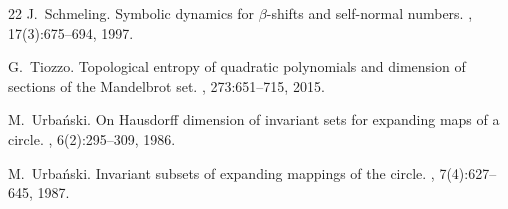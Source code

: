 \documentclass[11pt]{amsart}
\theoremstyle{definition}
\theoremstyle{remark}
\numberwithin{equation}{section}
\begin{document}
\begin{thebibliography}{22}
J.~Schmeling.
\newblock Symbolic dynamics for $\beta$-shifts and self-normal numbers.
, 17(3):675--694, 1997.

G.~Tiozzo.
\newblock Topological entropy of quadratic polynomials and dimension of sections of the Mandelbrot set.
, 273:651--715, 2015.

M.~Urba{\'n}ski.
\newblock On {H}ausdorff dimension of invariant sets for expanding maps of a circle.
, 6(2):295--309, 1986.

M.~Urba\'{n}ski.
\newblock Invariant subsets of expanding mappings of the circle.
, 7(4):627--645, 1987.

\end{thebibliography}



%
%
%
\end{document}
